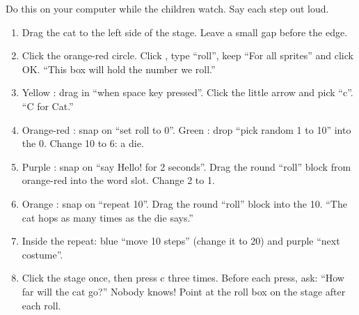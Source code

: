 \begin{workedexample}
Do this on your computer while the children watch. Say each step out loud.
\begin{enumerate}[leftmargin=1.4em,itemsep=1pt]
  \item Drag the cat to the left side of the stage. Leave a small gap before the edge.
  \item Click the orange-red  circle. Click , type \enquote{roll}, keep \enquote{For all sprites} and click OK. \enquote{This box will hold the number we roll.}
  \item Yellow : drag in \enquote{when space key pressed}. Click the little arrow and pick \enquote{c}. \enquote{C for Cat.}
  \item Orange-red : snap on \enquote{set roll to 0}. Green : drop \enquote{pick random 1 to 10} into the 0. Change 10 to 6: a die.
  \item Purple : snap on \enquote{say Hello! for 2 seconds}. Drag the round \enquote{roll} block from orange-red  into the word slot. Change 2 to 1.
  \item Orange : snap on \enquote{repeat 10}. Drag the round \enquote{roll} block into the 10. \enquote{The cat hops as many times as the die says.}
  \item Inside the repeat: blue  \enquote{move 10 steps} (change it to 20) and purple  \enquote{next costume}.
  \item Click the stage once, then press c three times. Before each press, ask: \enquote{How far will the cat go?} Nobody knows! Point at the roll box on the stage after each roll.
\end{enumerate}
\begin{center}
\begin{scratch}[scale=0.85]
\end{scratch}
\end{center}
\end{workedexample}

